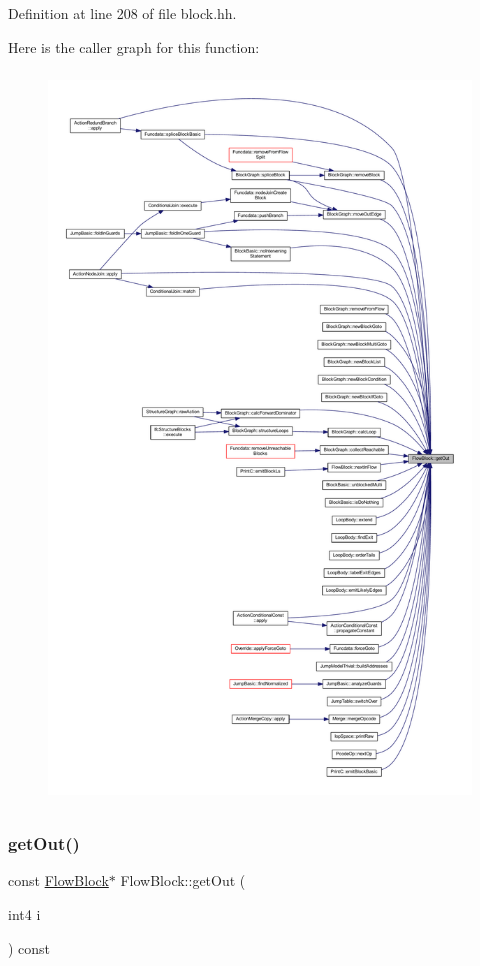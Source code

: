 Definition at line 208 of file block.\+hh.

Here is the caller graph for this function\+:
\nopagebreak
\begin{figure}[H]
\begin{center}
\leavevmode
\includegraphics[height=550pt]{class_flow_block_ab95b430d4c8470c379dba93613c3073b_icgraph}
\end{center}
\end{figure}
\mbox{\label{class_flow_block_a23c0935d91e6bc4e8eef2f78b158bb9a}} 
\subsubsection{\texorpdfstring{getOut()}{getOut()}\hspace{0.1cm}{\footnotesize\ttfamily [2/2]}}
{\footnotesize\ttfamily const \mbox{\hyperlink{class_flow_block}{Flow\+Block}}$\ast$ Flow\+Block\+::get\+Out (\begin{DoxyParamCaption}\item[{int4}]{i }\end{DoxyParamCaption}) const\hspace{0.3cm}{\ttfamily [inline]}}



